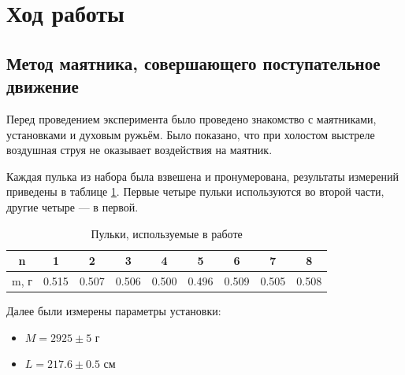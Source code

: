     \section{Ход работы}    
        \subsection{Метод маятника, совершающего поступательное движение}
            Перед проведением эксперимента было проведено знакомство с маятниками, установками и духовым ружьём. Было показано, что при холостом выстреле воздушная струя не оказывает воздействия на маятник.

            Каждая пулька из набора была взвешена и пронумерована, результаты измерений приведены в таблице \ref{table:bullets}. Первые четыре пульки используются во второй части, другие четыре --- в первой.
            
            \begin{table}
                \centering
                \begin{tabular}{|c|c|c|c|c||c|c|c|c|}
                    \hline
                    n & 1 & 2 & 3 & 4 & 5 & 6 & 7 & 8 \\
                    \hline
                    m, г & 0.515 & 0.507 & 0.506 & 0.500 & 0.496 & 0.509 & 0.505 & 0.508 \\
                    \hline
                \end{tabular}
                \caption{Пульки, используемые в работе}
                \label{table:bullets}
            \end{table}

            Далее были измерены параметры установки:
            \begin{itemize}
                \item $M = 2925 \pm 5 \text{ г}$
                \item $L = 217.6 \pm 0.5 \text{ см}$
            \end{itemize}


